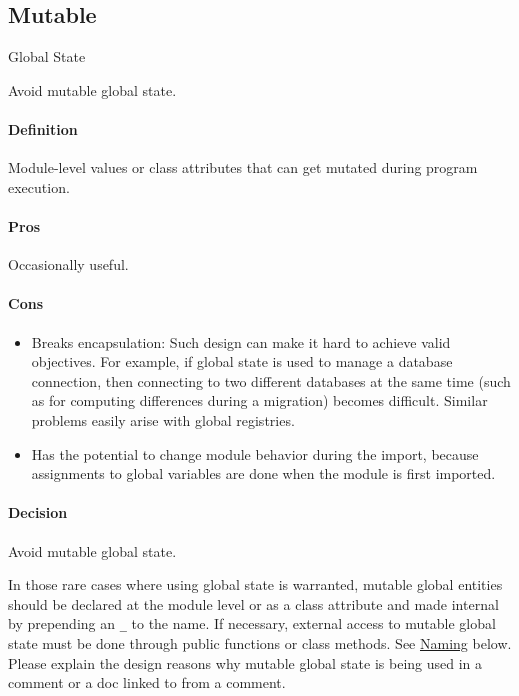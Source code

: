 \documentclass[
]{article}
\begin{document}
\subsection{Mutable} Global State

Avoid mutable global state.

\paragraph{Definition}

Module-level values or class attributes that can get mutated during
program execution.

\paragraph{Pros}

Occasionally useful.

\paragraph{Cons}

\begin{itemize}
\item
  Breaks encapsulation: Such design can make it hard to achieve valid
  objectives. For example, if global state is used to manage a database
  connection, then connecting to two different databases at the same
  time (such as for computing differences during a migration) becomes
  difficult. Similar problems easily arise with global registries.
\item
  Has the potential to change module behavior during the import, because
  assignments to global variables are done when the module is first
  imported.
\end{itemize}

\paragraph{Decision}

Avoid mutable global state.

In those rare cases where using global state is warranted, mutable
global entities should be declared at the module level or as a class
attribute and made internal by prepending an \texttt{\_} to the name. If
necessary, external access to mutable global state must be done through
public functions or class methods. See \hyperref[s3.16-naming]{Naming}
below. Please explain the design reasons why mutable global state is
being used in a comment or a doc linked to from a comment.
\end{document}
